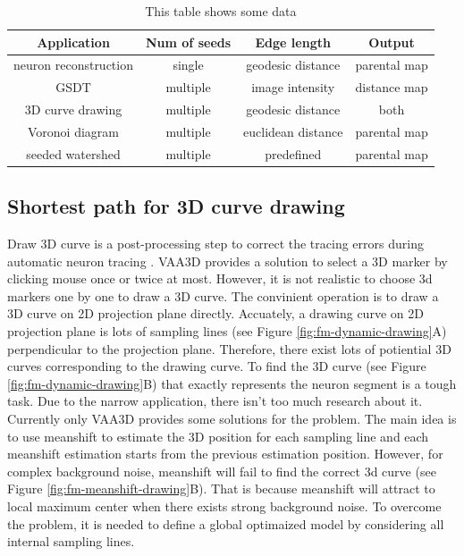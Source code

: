 \begin{table}
\begin{center}
\begin{tabular}{ | c | c | c | c |}
    \hline
    \textbf{Application} & \textbf{Num of seeds} & \textbf{Edge length} & \textbf{Output} \\ \hline
    neuron reconstruction & single & geodesic distance & parental map \\ \hline
    GSDT & multiple & image intensity & distance map  \\ \hline
    3D curve drawing & multiple & geodesic distance & both \\ \hline
    Voronoi diagram & multiple & euclidean distance & parental map  \\ \hline
    seeded watershed & multiple & predefined & parental map \\ \hline
  \end{tabular}
\end{center}
\caption{This table shows some data}
\label{tab:fm-app}
\end{table}

\subsection{Shortest path for 3D curve drawing}
\label{sect:fm-3dcurve}
Draw 3D curve is a post-processing step to correct the tracing errors during automatic neuron tracing \cite{peng2011automatic, Xiao:2011}. VAA3D \cite{peng2010v3d} provides a solution to select a 3D marker by clicking mouse once or twice at most. However, it is not realistic to choose 3d markers one by one to draw a 3D curve. The convinient operation is to draw a 3D curve on 2D projection plane directly. Accuately, a drawing curve on 2D projection plane is lots of sampling lines (see Figure \ref{fig:fm-dynamic-drawing}A) perpendicular to the projection plane. Therefore, there exist lots of potiential 3D curves corresponding to the drawing curve. To find the 3D curve (see Figure \ref{fig:fm-dynamic-drawing}B) that exactly represents the neuron segment is a tough task. Due to the narrow application, there isn't too much research about it.\\
Currently only VAA3D provides some solutions for the problem. The main idea is to use meanshift \cite{comaniciu2002mean} to estimate the 3D position for each sampling line and each meanshift estimation starts from the previous estimation position. However, for complex background noise, meanshift will fail to find the correct 3d curve (see Figure \ref{fig:fm-meanshift-drawing}B). That is because meanshift will attract to local maximum center when there exists strong background noise. To overcome the problem, it is needed to define a global optimaized model by considering all internal sampling lines. \\

